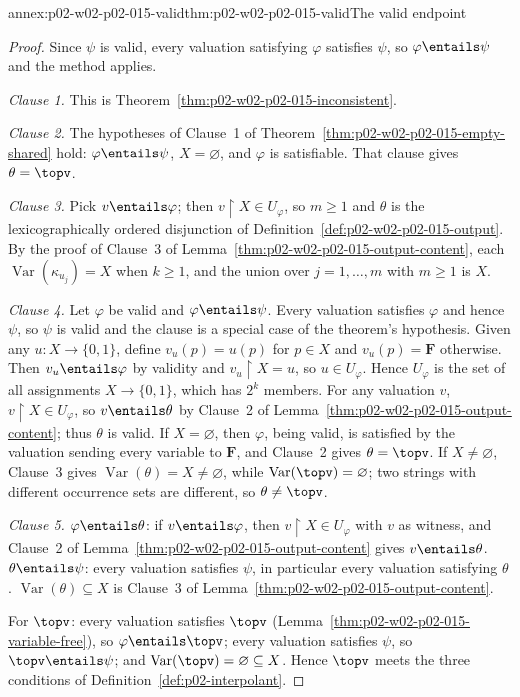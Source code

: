 \begin{annexitem}{annex:p02-w02-p02-015-valid}{thm:p02-w02-p02-015-valid}{The valid endpoint}
\begin{proof}
Since \(\psi\) is valid, every valuation satisfying \(\varphi\) satisfies
\(\psi\), so \(\varphi\entails\psi\) and the method applies.

\emph{Clause 1.}  This is Theorem~\ref{thm:p02-w02-p02-015-inconsistent}.

\emph{Clause 2.}  The hypotheses of Clause~1 of
Theorem~\ref{thm:p02-w02-p02-015-empty-shared} hold: \(\varphi\entails\psi\),
\(X=\varnothing\), and \(\varphi\) is satisfiable.  That clause gives
\(\theta=\topv\).

\emph{Clause 3.}  Pick \(v\entails\varphi\); then
\(v\mathbin{\upharpoonright}X\in U_\varphi\), so \(m\geq 1\) and \(\theta\)
is the lexicographically ordered disjunction of
Definition~\ref{def:p02-w02-p02-015-output}.  By the proof of Clause~3 of
Lemma~\ref{thm:p02-w02-p02-015-output-content}, each
\(\operatorname{Var}(\kappa_{u_j})=X\) when \(k\geq 1\), and the union over
\(j=1,\ldots,m\) with \(m\geq 1\) is \(X\).

\emph{Clause 4.}  Let \(\varphi\) be valid and \(\varphi\entails\psi\).
Every valuation satisfies \(\varphi\) and hence \(\psi\), so \(\psi\) is valid
and the clause is a special case of the theorem's hypothesis.  Given any
\(u:X\to\{0,1\}\), define \(v_u(p)=u(p)\) for \(p\in X\) and
\(v_u(p)=\mathbf{F}\) otherwise.  Then \(v_u\entails\varphi\) by validity and
\(v_u\mathbin{\upharpoonright}X=u\), so \(u\in U_\varphi\).  Hence
\(U_\varphi\) is the set of all assignments \(X\to\{0,1\}\), which has
\(2^{k}\) members.  For any valuation \(v\),
\(v\mathbin{\upharpoonright}X\in U_\varphi\), so \(v\entails\theta\) by Clause~2
of Lemma~\ref{thm:p02-w02-p02-015-output-content}; thus \(\theta\) is valid.
If \(X=\varnothing\), then \(\varphi\), being valid, is satisfied by the
valuation sending every variable to \(\mathbf{F}\), and Clause~2 gives
\(\theta=\topv\).  If \(X\neq\varnothing\), Clause~3 gives
\(\operatorname{Var}(\theta)=X\neq\varnothing\), while
\(\operatorname{Var}(\topv)=\varnothing\); two strings with different
occurrence sets are different, so \(\theta\neq\topv\).

\emph{Clause 5.}  \(\varphi\entails\theta\): if \(v\entails\varphi\), then
\(v\mathbin{\upharpoonright}X\in U_\varphi\) with \(v\) as witness, and Clause~2
of Lemma~\ref{thm:p02-w02-p02-015-output-content} gives \(v\entails\theta\).
\(\theta\entails\psi\): every valuation satisfies \(\psi\), in particular
every valuation satisfying \(\theta\).  \(\operatorname{Var}(\theta)\subseteq
X\) is Clause~3 of Lemma~\ref{thm:p02-w02-p02-015-output-content}.

For \(\topv\): every valuation satisfies \(\topv\)
(Lemma~\ref{thm:p02-w02-p02-015-variable-free}), so \(\varphi\entails\topv\);
every valuation satisfies \(\psi\), so \(\topv\entails\psi\); and
\(\operatorname{Var}(\topv)=\varnothing\subseteq X\).  Hence \(\topv\) meets
the three conditions of Definition~\ref{def:p02-interpolant}.
\end{proof}
\end{annexitem}

